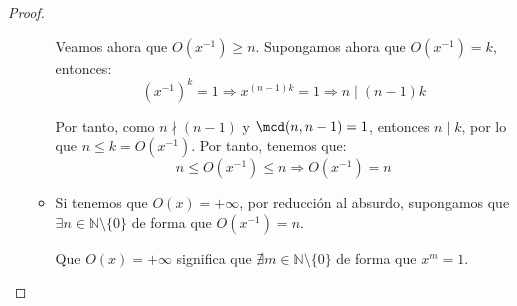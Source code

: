 \begin{prop}
\begin{proof}
\begin{enumerate}
\begin{itemize}
                    Veamos ahora que $O(x^{-1})\geq n$. Supongamos ahora que $O(x^{-1})=k$, entonces:
                    \begin{equation*}
                        (x^{-1})^k = 1 \Longrightarrow x^{(n-1)k} = 1 \Longrightarrow n\mid (n-1)k
                    \end{equation*}

                    Por tanto, como $n \nmid (n-1)$ y $\mcd(n,n-1)=1$, entonces $n\mid k$, por lo que $n\leq k=O(x^{-1})$. Por tanto, tenemos que:
                    \begin{equation*}
                        n\leq O(x^{-1})\leq n \Longrightarrow O(x^{-1}) = n
                    \end{equation*}

                    \item Si tenemos que $O(x) = +\infty$, por reducción al absurdo, supongamos que $\exists n\in \mathbb{N}\setminus\{0\}$ de forma que $O(x^{-1}) = n$.

                        Que $O(x)=+\infty$ significa que $\nexists m\in \mathbb{N}\setminus\{0\}$ de forma que $x^m = 1$.


\end{itemize}
\end{enumerate}
\end{proof}
\end{prop}
